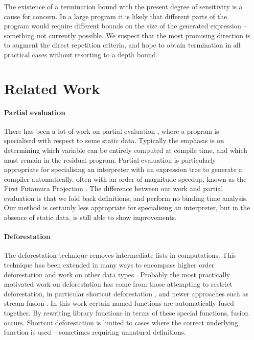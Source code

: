 \documentclass{llncs}
\begin{document}
The existence of a termination bound with the present degree of sensitivity is a cause for concern. In a large program it is likely that different parts of the program would require different bounds on the size of the generated expression -- something not currently possible. We suspect that the most promising direction is to augment the direct repetition criteria, and hope to obtain termination in all practical cases without resorting to a depth bound.

\section{Related Work}
\label{sec:related}

\paragraph{Partial evaluation} There has been a lot of work on partial evaluation \cite{jones:partial_evaluation}, where a program is specialised with respect to some static data. Typically the emphasis is on determining which variable can be entirely computed at compile time, and which must remain in the residual program. Partial evaluation is particularly appropriate for specialising an interpreter with an expression tree to generate a compiler automatically, often with an order of magnitude speedup, known as the First Futamura Projection \cite{futanama:projections}. The difference between our work and partial evaluation is that we fold back definitions, and perform no binding time analysis. Our method is certainly less appropriate for specialising an interpreter, but in the absence of static data, is still able to show improvements.

\paragraph{Deforestation} The deforestation technique \cite{wadler:deforestation} removes intermediate lists in computations. This technique has been extended in many ways to encompass higher order deforestation \cite{marlow:higher_order_deforestation} and work on other data types \cite{coutts:string_fusion}. Probably the most practically motivated work on deforestation has come from those attempting to restrict deforestation, in particular shortcut deforestation \cite{gill:shortcut_deforestation}, and newer approaches such as stream fusion \cite{coutts:stream_fusion}. In this work certain named functions are automatically fused together. By rewriting library functions in terms of these special functions, fusion occurs. Shortcut deforestation is limited to cases where the correct underlying function is used -- sometimes requiring unnatural definitions.
\end{document}
